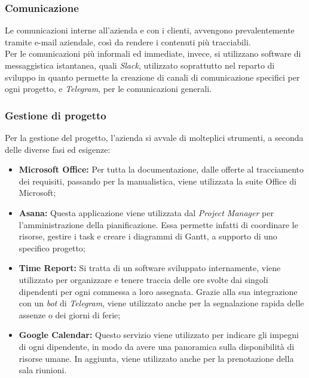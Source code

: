 \subsubsection*{Comunicazione}
Le comunicazioni interne all'azienda e con i clienti, avvengono prevalentemente tramite e-mail aziendale, così da rendere i contenuti più tracciabili.\\
Per le comunicazioni più informali ed immediate, invece, si utilizzano software di messaggistica istantanea, quali \textit{Slack}, utilizzato soprattutto nel reparto di sviluppo in quanto permette la creazione di canali di comunicazione specifici per ogni progetto, e \textit{Telegram}, per le comunicazioni generali.

\subsubsection*{Gestione di progetto}
Per la gestione del progetto, l'azienda si avvale di molteplici strumenti, a seconda delle diverse fasi ed esigenze:
\begin{itemize}

\item \textbf{Microsoft Office:} Per tutta la documentazione, dalle offerte al tracciamento dei requisiti, passando per la manualistica, viene utilizzata la suite Office di Microsoft;

\item \textbf{Asana:} Questa applicazione viene utilizzata dal \textit{Project Manager} per l'amministrazione della pianificazione. Essa permette infatti di coordinare le risorse, gestire i task e creare i diagrammi di Gantt, a supporto di uno specifico progetto;

\item \textbf{Time Report:} Si tratta di un software sviluppato internamente, viene utilizzato per organizzare e tenere traccia delle ore svolte dai singoli dipendenti per ogni commessa a loro assegnata. Grazie alla sua integrazione con un \textit{bot} di \textit{Telegram}, viene utilizzato anche per la segnalazione rapida delle assenze o dei giorni di ferie;

\item \textbf{Google Calendar:} Questo servizio viene utilizzato per indicare gli impegni di ogni dipendente, in modo da avere una panoramica sulla disponibilità di risorse umane. In aggiunta, viene utilizzato anche per la prenotazione della sala riunioni.
\end{itemize}

